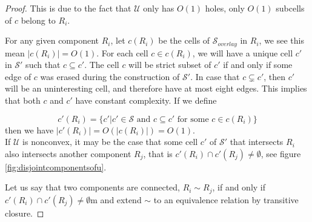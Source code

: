 \begin{proof}
This is due to the fact that $\mathcal{U}$ only has $O(1)$ holes, only $O(1)$ subcells 
of $c$ belong to $R_i$. 

For any given component $R_i$, let $c(R_i)$ be the cells of $\mathcal{S}_{overlay}$ in $R_i$, 
we see this mean $|c(R_i)| = O(1)$. For each cell $c\in c(R_i)$, we will have a unique cell $c'$ 
in $\mathcal{S}'$ such that $c \subseteq c'$. The cell $c$ will be strict subset of $c'$ if 
and only if some edge of $c$ was erased during the construction of $\mathcal{S}'$. 
In case that $c \subsetneq c'$, then $c'$ will be an uninteresting cell, and therefore have at 
most eight edges. This implies that both $c$ and $c'$ have constant complexity. 
If we define

$$c'(R_i)=\{c'|c'\in\mathcal{S} \text{ and } c \subseteq c' \text{ for some } c\in c(R_i)\}$$
then we have $|c'(R_i)| = O(|c(R_i)|) = O(1)$. \\

If $\mathcal{U}$ is nonconvex, it may be the case that some cell $c'$ of $\mathcal{S}'$ that 
intersects $R_i$ also intersects another component $R_j$, that is $c'(R_i)\cap c'(R_j) \neq 
\emptyset$, see figure \ref{fig:disjointcomponentsofu}.


Let us say that two components are connected, $R_i \sim R_j$, if and only if
$c'(R_i) \cap c'(R_j) \neq \emptyset$m and extend $\sim$ to an equivalence
relation by transitive closure.


\end{proof}
